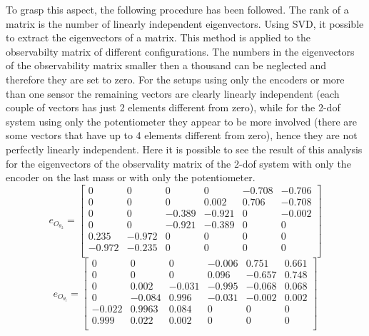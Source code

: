 To grasp this aspect, the following procedure has been followed. The rank of a matrix is the number of linearly independent eigenvectors.
\label{SVD_explaination}
Using SVD, it possible to extract the eigenvectors of a matrix. This method is applied to the observabilty matrix of different configurations. The numbers in the eigenvectors of the observability matrix smaller then a thousand can be neglected and therefore they are set to zero. For the setups using only the encoders or more than one sensor the remaining vectors are clearly linearly independent (each couple of vectors has just 2 elements different from zero), while for the \acrshort{2-dof} system using only the potentiometer they appear to be more involved (there are some vectors that have up to 4 elements different from zero), hence they are not perfectly linearly independent.
Here it is possible to see the result of this analysis for the eigenvectors of the observality matrix of the \acrshort{2-dof} system with only the encoder on the last mass or with only the potentiometer. 
\begin{equation}
	e_{O_{\theta_{2}}}= \begin{bmatrix}
		0& 0 & 0 & 0 		& -0.708 & -0.706 \\
		0& 0 & 0 & 0.002 &  0.706 & -0.708 \\
		0& 0 & -0.389 & -0.921 & 0 & -0.002 \\
		0& 0 & -0.921 & -0.389 & 0 & 0 \\
		0.235 & -0.972 & 0 & 0 & 0 & 0 \\
		-0.972 & -0.235 & 0 & 0 & 0 & 0 \\
	\end{bmatrix}
\end{equation}
\begin{equation}
	e_{O_{\theta_{l}}}= \begin{bmatrix}
		0& 0 & 0 & -0.006  & 0.751 & 0.661 \\
		0& 0 & 0 & 0.096 &  -0.657 & 0.748 \\
		0& 0.002 & -0.031 & -0.995 & -0.068 & 0.068 \\
		0& -0.084 & 0.996 & -0.031 & -0.002& 0.002 \\
		-0.022 & 0.9963 & 0.084 & 0 & 0 & 0 \\
		0.999 & 0.022 & 0.002 & 0 & 0 & 0 \\
	\end{bmatrix}
\end{equation}